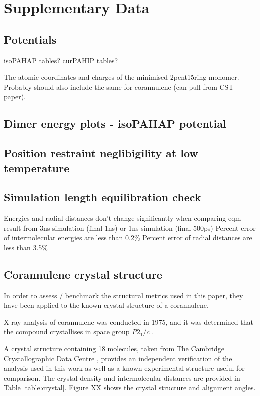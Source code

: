 \section{Supplementary Data}
\label{supplinfo}


\subsection{Potentials}
isoPAHAP tables?
curPAHIP tables?

The atomic coordinates and charges of the minimised 2pent15ring monomer.
Probably should also include the same for corannulene (can pull from CST paper).

\subsection{Dimer energy plots - isoPAHAP potential}

\subsection{Position restraint neglibigility at low temperature}

\subsection{Simulation length equilibration check}
Energies and radial distances don't change significantly when comparing eqm result from 3ns simulation (final 1ns) or 1ns simulation (final 500ps)
Percent error of intermolecular energies are less than 0.2\%
Percent error of radial distances are less than 3.5\%



\subsection{Corannulene crystal structure}
In order to assess / benchmark the structural metrics used in this paper, they have been applied to the known crystal structure of a corannulene. %

X-ray analysis of corannulene was conducted in 1975, and it was determined that the compound crystallises in space group \textit{P}$2_{1}/c$ \cite{hanson1976crystal}.

A crystal structure containing 18 molecules, taken from The Cambridge Crystallographic Data Centre \cite{CORANN11unitcell}, provides an independent verification of the analysis used in this work as well as a known experimental structure useful for comparison.  The crystal density and intermolecular distances are provided in Table \ref{table:crystal}.  Figure XX shows the crystal structure and alignment angles.

